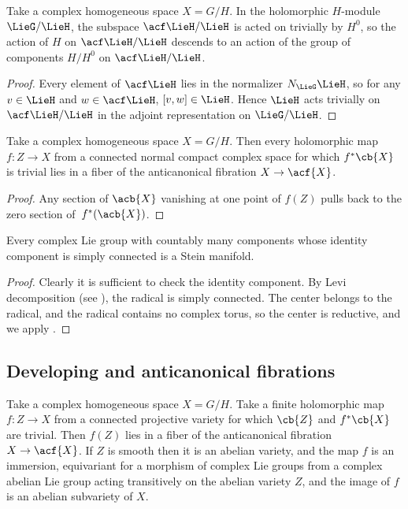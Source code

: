 \begin{Corollary}\label{corollary:trivial.conn}
Take a complex homogeneous space $X = G/H$.
In the holomorphic $H$-mod\-ule~$\LieG/\LieH$, the subspace $\acf\LieH/\LieH$ is acted on trivially by $H^0$, so the action
of $H$ on $\acf\LieH/\LieH$ descends to an action of the group of components $H/H^0$ on $\acf\LieH/\LieH$.
\end{Corollary}

\begin{proof}
Every element of $\acf\LieH$ lies in the normalizer $N_{\LieG} \LieH$, so for any $v \in \LieH$ and $w \in
\acf\LieH$, $[v, w] \in \LieH$.
Hence $\LieH$ acts trivially on $\acf\LieH/\LieH$ in the adjoint representation on $\LieG/\LieH$.
\end{proof}

\begin{Lemma}\label{lemma:in.the.fiber}
Take a complex homogeneous space $X = G/H$.
Then every holomorphic map $f \colon Z \to X $ from a connected normal compact complex space for
which $f^*\cb{X}$ is trivial lies in a fiber of the anticanonical fibration $X \to \acf{X}$.
\end{Lemma}

\begin{proof}
Any section of $\acb{X}$ vanishing at one point of $f(Z)$ pulls back to the zero section of~$f^*(\acb{X})$.
\end{proof}

\begin{Lemma}\label{lemma:Stein.G}
Every complex Lie group with countably many components whose identity component is simply connected is a Stein manifold.
\end{Lemma}

\begin{proof}
Clearly it is sufficient to check the identity component.
By Levi decomposition (see \cite[Theorem 16.3.7]{Hilgert.Neeb:2012}), the radical is simply connected.
The center belongs to the radical, and the radical contains no complex torus, so the center is reductive, and we apply
\cite[Theorem 1]{Matsushima/Morimoto:1960}.
\end{proof}

\subsection{Developing and anticanonical fibrations}

\begin{Lemma}\label{lemma:ab.var.in.fiber}
Take a complex homogeneous space $X = G/H$.
Take a finite holomorphic map $f \colon Z\to X$ from a connected projective variety for which $\cb{Z}$ and $f^*\cb{X}$ are trivial.
Then $f(Z)$ lies in a fiber of the anticanonical fibration $X\to \acf{X}$.
If $Z$ is smooth then it is an abelian variety, and the map $f$ is an immersion, equivariant for a morphism of complex Lie groups from a complex abelian Lie group acting transitively on the abelian variety $Z$, and the image of $f$ is an abelian subvariety of $X$.
\end{Lemma}

